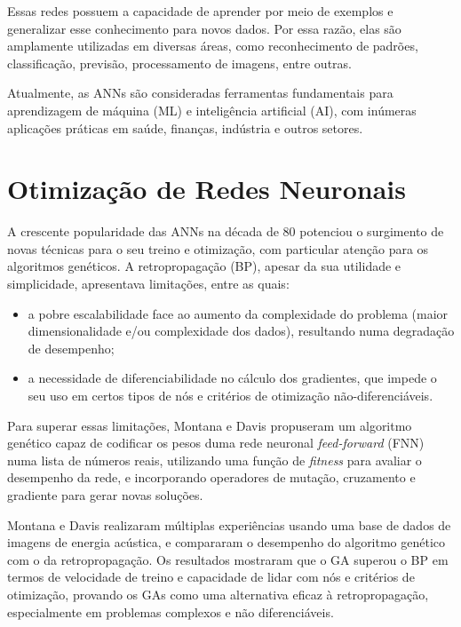 \documentclass[a4paper, portuguese]{report}
\begin{document}
Essas redes possuem a capacidade de aprender por meio de exemplos e generalizar esse conhecimento para novos dados. Por essa razão, elas são amplamente utilizadas em diversas áreas, como reconhecimento de padrões, classificação, previsão, processamento de imagens, entre outras. \cite{Jain1996ArtificialTutorial}

Atualmente, as ANNs são consideradas ferramentas fundamentais para aprendizagem de máquina (ML) e inteligência artificial (AI), com inúmeras aplicações práticas em saúde, finanças, indústria e outros setores.

\section{Otimização de Redes Neuronais}\label{sec:optim_nns}

A crescente popularidade das ANNs na década de 80 potenciou o surgimento de novas técnicas para o seu treino e otimização, com particular atenção para os algoritmos genéticos. A retropropagação (BP), apesar da sua utilidade e simplicidade, apresentava limitações, entre as quais:
\begin{itemize}
    \item a pobre escalabilidade face ao aumento da complexidade do problema (maior dimensionalidade e/ou complexidade dos dados), resultando numa degradação de desempenho;
    \item a necessidade de diferenciabilidade no cálculo dos gradientes, que impede o seu uso em certos tipos de nós e critérios de otimização não-diferenciáveis.
\end{itemize}

Para superar essas limitações, Montana e Davis \cite{Montana1989} propuseram um algoritmo genético capaz de codificar os pesos duma rede neuronal \textit{feed-forward} (FNN) numa lista de números reais, utilizando uma função de \textit{fitness} para avaliar o desempenho da rede, e incorporando operadores de mutação, cruzamento e gradiente para gerar novas soluções. 

Montana e Davis realizaram múltiplas experiências usando uma base de dados de imagens de energia acústica, e compararam o desempenho do algoritmo genético com o da retropropagação. Os resultados mostraram que o GA superou o BP em termos de velocidade de treino e capacidade de lidar com nós e critérios de otimização, provando os GAs como uma alternativa eficaz à retropropagação, especialmente em problemas complexos e não diferenciáveis.
\end{document}
